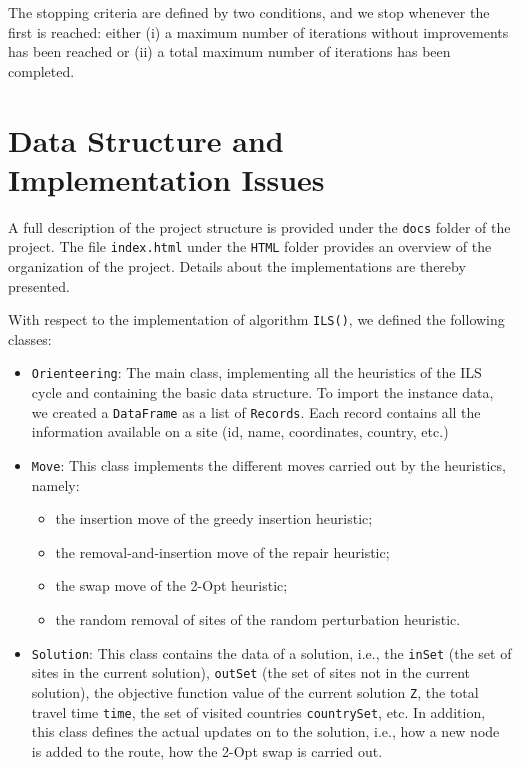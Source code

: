 \documentclass[12pt]{article}
\begin{document}
The stopping criteria are defined by two conditions, and we stop whenever the
first is reached: either (i) a maximum number of iterations without improvements has
been reached or (ii) a total maximum number of iterations has been completed.

\section{Data Structure and Implementation Issues}

A full description of the project structure is provided under the
\texttt{docs} folder of the project. The file \texttt{index.html} under the
\texttt{HTML} folder provides an overview of the organization of the project.
Details about the implementations are thereby presented.

With respect to the implementation of algorithm \texttt{ILS()}, we defined the
following classes:
\begin{itemize}
\item \texttt{Orienteering}: The main class, implementing all the heuristics of
the ILS cycle and
containing the basic data structure. To import the instance data, we created a
\texttt{DataFrame} as a list of \texttt{Records}. Each record contains all the
information available on a site (id, name, coordinates, country, etc.)
\item \texttt{Move}: This class implements the different moves carried out by
the heuristics, namely:
\begin{itemize}
\item the insertion move of the greedy insertion heuristic;
\item the removal-and-insertion move of the repair heuristic;
\item the swap move of the 2-Opt heuristic;
\item the random removal of sites of the random perturbation heuristic.
\end{itemize}
\item \texttt{Solution}: This class contains the data of a solution, i.e., the
\texttt{inSet} (the set of sites in the current solution), \texttt{outSet}
(the set of sites not in the current solution), the objective function value of
the current solution \texttt{Z}, the total travel time \texttt{time}, the set
of visited countries \texttt{countrySet}, etc. In addition, this class defines
the actual updates on to the solution, i.e., how a new node is added to the
route, how the 2-Opt swap is carried out.
\end{itemize}
\end{document}

